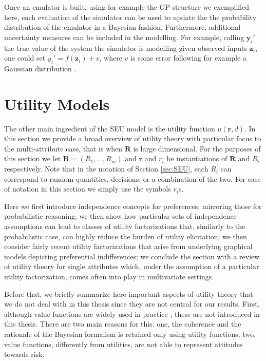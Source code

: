 Once an emulator is built, using for example the \gls{GP} structure we exemplified here, each evaluation of the simulator can be used to update the the probability distribution of the emulator in a Bayesian fashion. Furthermore, additional uncertainty measures can be included in the modelling. For example, calling $\bm{y}_i'$ the true value of the system the simulator is modelling given observed inputs $\bm{z}_i$, one could set $y_i'=f(\bm{z}_i)+v$, where $v$ is some error following for example a Gaussian distribution \citep[see][for more comments on these modelling techniques]{Kennedy2000}.

\section{Utility Models}
\label{sec:ut}
The other main ingredient of the \gls{SEU} model is the utility function $u(\bm{r},d)$. In this section we provide a broad overview of utility theory with particular focus to the multi-attribute case, that is when $\bm{R}$ is large dimensional. For the purposes of this section we let $\bm{R}=(R_1,\dots,R_m)$ and $\bm{r}$ and $r_i$ be instantiations of $\bm{R}$ and $R_i$ respectively. Note that in the notation of Section \ref{sec:SEU}, each $R_i$ can correspond to random quantities, decisions, or a combination of the two. For ease of notation in this section we simply use the symbols $r_i$s.

 Here we first introduce independence concepts for preferences, mirroring those for probabilistic reasoning; we  then show how particular sets of independence assumptions can lead to classes of utility factorizations that, similarly to the probabilistic case, can highly reduce the burden of utility elicitation; we then consider fairly recent utility factorizations that arise from underlying graphical models depicting preferential indifferences; we conclude the section with a review of utility theory for single attributes which, under the assumption of a particular utility factorization, comes often into play in multivariate settings. 

Before that, we briefly summarize here important aspects of utility theory that we do not deal with in this thesis since they are not central for our results. First, although value functions are widely used in practice \citep{Belton2002,Keeney1993a}, these are not introduced in this thesis. There are two main reasons for this: one, the coherence and the rationale of the Bayesian formalism is retained only using utility functions; two, value functions, differently from utilities, are not able to represent attitudes towards risk. 

